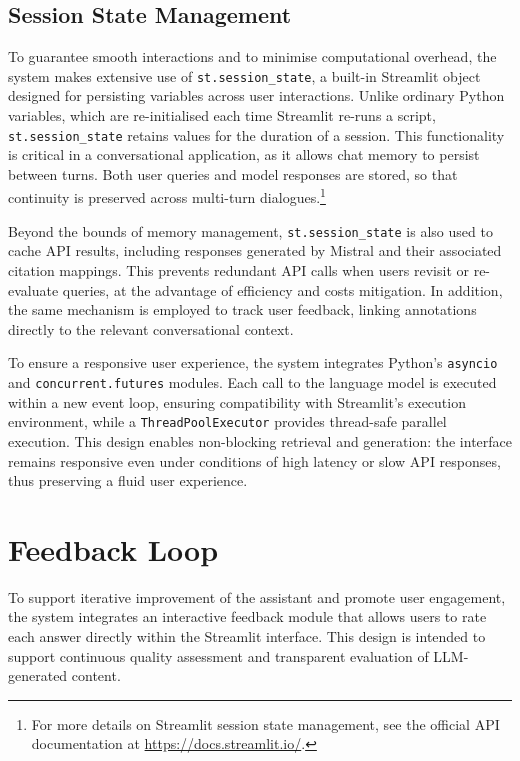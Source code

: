\begin{spacing}{1.5}
\subsection{Session State Management}
To guarantee smooth interactions and to minimise computational overhead, the system makes extensive use of \texttt{st.session\_state}, a built-in Streamlit object designed for persisting variables across user interactions. Unlike ordinary Python variables, which are re-initialised each time Streamlit re-runs a script, \texttt{st.session\_state} retains values for the duration of a session. This functionality is critical in a conversational application, as it allows chat memory to persist between turns. Both user queries and model responses are stored, so that continuity is preserved across multi-turn dialogues.\footnote{For more details on Streamlit session state management, see the official API documentation at \url{https://docs.streamlit.io/}.\nocite{noauthor_streamlit_2025}} 

Beyond the bounds of memory management, \texttt{st.session\_state} is also used to cache API results, including responses generated by Mistral and their associated citation mappings. This prevents redundant API calls when users revisit or re-evaluate queries, at the advantage of efficiency and costs mitigation. In addition, the same mechanism is employed to track user feedback, linking annotations directly to the relevant conversational context.

To ensure a responsive user experience, the system integrates Python’s \texttt{asyncio} and \texttt{concurrent.futures} modules. Each call to the language model is executed within a new event loop, ensuring compatibility with Streamlit’s execution environment, while a \texttt{ThreadPoolExecutor} provides thread-safe parallel execution. This design enables non-blocking retrieval and generation: the interface remains responsive even under conditions of high latency or slow API responses, thus preserving a fluid user experience.


\section{Feedback Loop}
To support iterative improvement of the assistant and promote user engagement, the system integrates an interactive feedback module that allows users to rate each answer directly within the Streamlit interface. This design is intended to support continuous quality assessment and transparent evaluation of LLM-generated content.


\end{spacing}
